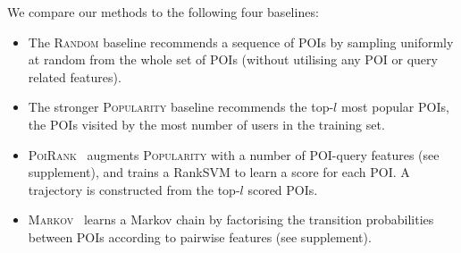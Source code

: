 We compare our methods to the following four baselines:
\begin{itemize}[leftmargin=0.125in]%
\item The \textsc{Random} baseline recommends a sequence of POIs by sampling uniformly at random from the whole set of POIs
      (without utilising any POI or query related features). 

\item The stronger \textsc{Popularity} baseline recommends the top-$l$ most popular POIs,
      \ie the POIs visited by the most number of users in the training set.

\item \textsc{PoiRank}~\cite{cikm16paper}
      augments \textsc{Popularity} with a number of POI-query features (see supplement),
      and trains a RankSVM %
      to learn a score for each POI.
      A trajectory is constructed from the top-$l$ scored POIs.

\item \textsc{Markov}~\cite{cikm16paper} learns a Markov chain by factorising the transition probabilities between POIs 
      according to %
      pairwise features (see supplement). 

\end{itemize}%

